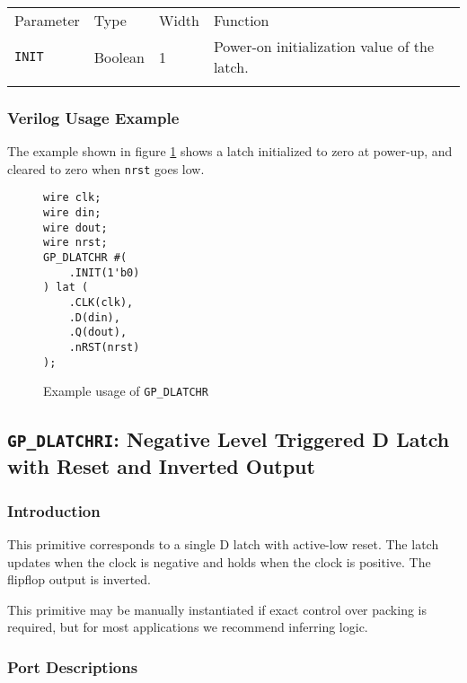 \documentclass[11pt]{article}
\newcommand{\tokenstyle}[1]{\texttt{#1}}
\newcommand{\wirestyle}[1]{\texttt{#1}}
\newcommand{\whenstyle}[1]{{\fontseries{sb}\selectfont#1}}
\newcommand{\thinhline}{\Xhline{1\arrayrulewidth}}
\newcommand{\thickhline}{\Xhline{2.5\arrayrulewidth}}
\begin{document}
\begin{tabularx}{\textwidth}{lllX}
\thinhline
\whenstyle{Parameter} & \whenstyle{Type} & \whenstyle{Width} & \whenstyle{Function} \\
\thickhline
\tokenstyle{INIT} & Boolean & 1 & Power-on initialization value of the latch.\\
\thinhline
\end{tabularx}

\subsubsection{Verilog Usage Example}

The example shown in figure \ref{gp-dlatchr-example} shows a latch initialized to zero at power-up, and cleared to zero
when \wirestyle{nrst} goes low.

\begin{figure}[h]
\begin{lstlisting}
wire clk;
wire din;
wire dout;
wire nrst;
GP_DLATCHR #(
	.INIT(1'b0)
) lat (
	.CLK(clk),
	.D(din),
	.Q(dout),
	.nRST(nrst)
);
\end{lstlisting}
\caption{Example usage of \tokenstyle{GP\_DLATCHR}}
\label{gp-dlatchr-example}
\end{figure}


\pagebreak
\subsection{\tokenstyle{GP\_DLATCHRI}: Negative Level Triggered D Latch with Reset and Inverted Output}
\label{gp-latchri}

\subsubsection{Introduction}
This primitive corresponds to a single D latch with active-low reset. The latch updates when the clock is negative and holds 
when the clock is positive. The flipflop output is inverted.

This primitive may be manually instantiated if exact control over packing is required, but for most applications we
recommend inferring logic.

\subsubsection{Port Descriptions}
\end{document}
